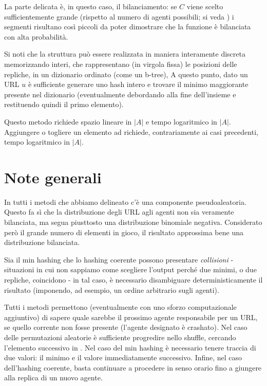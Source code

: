 La parte delicata è, in questo caso, il bilanciamento: se $C$ viene scelto sufficientemente grande (rispetto al numero di agenti possibili; si veda %
) i segmenti risultano così piccoli da poter dimostrare che la funzione è bilanciata con alta probabilità.

Si noti che la struttura può essere realizzata in maniera interamente discreta memorizzando interi, che rappresentano (in virgola fissa) le posizioni delle repliche, in un dizionario ordinato (come un b-tree), A questo punto, dato un URL $u$ è sufficiente generare uno hash intero e trovare il minimo maggiorante presente nel dizionario (eventualmente debordando alla fine dell'insieme e restituendo quindi il primo elemento).

Questo metodo richiede spazio lineare in $|A|$ e tempo logaritmico in $|A|$. Aggiungere o togliere un elemento ad  richiede, contrariamente ai casi precedenti, tempo logaritmico in $|A|$.
\section{Note generali}
In tutti i metodi che abbiamo delineato c'è una componente pseudoaleatoria. Questo fa sì che la distribuzione degli URL agli agenti non sia veramente bilanciata, ma segua piusttosto una distribuzione binomiale negativa. Considerato però il grande numero di elementi in gioco, il risultato approssima bene una distribuzione bilanciata.

Sia il min hashing che lo hashing coerente possono presentare \textit{collisioni} - situazioni in cui non sappiamo come scegliere l'output perché due minimi, o due repliche, coincidono - in tal caso, è necessario disambiguare deterministicamente il risultato (imponendo, ad esempio, un ordine arbitrario sugli agenti).

Tutti i metodi permettono (eventualmente con uno sforzo computazionale aggiuntivo) di sapere quale sarebbe il prossimo agente responsabile per un URL, se quello corrente non fosse presente (l'agente designato è crashato). Nel caso delle permutazioni aleatorie è sufficiente progredire nello shuffle, cercando l'elemento successivo in . Nel caso del min hashing è necessario tenere traccia di due valori: il minimo e il valore immediatamente successivo. Infine, nel caso dell'hashing coerente, basta continuare a procedere in senso orario fino a giungere alla replica di un nuovo agente.
